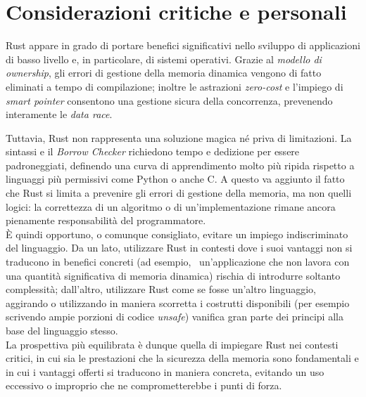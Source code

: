\section{Considerazioni critiche e personali}\label{sec:critique}
Rust appare in grado di portare benefici significativi nello sviluppo di applicazioni di basso livello e, in particolare, di sistemi operativi.
Grazie al \textit{modello di ownership}, gli errori di gestione della memoria dinamica vengono di fatto eliminati a tempo di compilazione; inoltre 
le astrazioni \textit{zero-cost} e l'impiego di \textit{smart pointer} consentono una gestione sicura della concorrenza, prevenendo interamente le \textit{data race}.

Tuttavia, Rust non rappresenta una soluzione magica né priva di limitazioni. La sintassi e il \textit{Borrow Checker} richiedono tempo e dedizione per essere
padroneggiati, definendo una curva di apprendimento molto più ripida rispetto a linguaggi più permissivi come Python o anche C. A questo va aggiunto il fatto 
che Rust si limita a prevenire gli errori di gestione della memoria, ma non quelli logici: la correttezza di un algoritmo o di un'implementazione 
rimane ancora pienamente responsabilità del programmatore. \hfill 
\vspace{10pt}\\
\noindent È quindi opportuno, o comunque consigliato, evitare un impiego indiscriminato del linguaggio. Da un lato, utilizzare Rust in contesti 
dove i suoi vantaggi non si traducono in benefici concreti 
(ad esempio, \  un'applicazione che non lavora con una quantità significativa di memoria dinamica)
rischia di introdurre soltanto complessità;
dall'altro, utilizzare Rust come se fosse un'altro linguaggio, aggirando o utilizzando in maniera scorretta i costrutti 
disponibili (per esempio scrivendo ampie porzioni di codice \textit{unsafe}) vanifica gran parte dei 
principi alla base del linguaggio stesso. \hfill 
\vspace{10pt}\\
\noindent La prospettiva più equilibrata è dunque quella di impiegare Rust nei contesti critici, in cui sia le prestazioni che la sicurezza della memoria sono 
fondamentali e in cui i vantaggi offerti si traducono in maniera concreta, evitando un uso eccessivo o improprio che ne comprometterebbe i punti di forza.